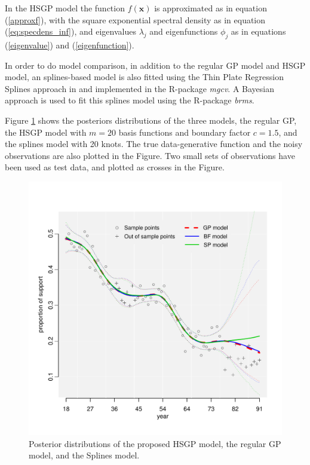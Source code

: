 \documentclass[]{interact}
\theoremstyle{plain}%
\theoremstyle{definition}
\theoremstyle{remark}
\begin{document}
In the HSGP model the function $f(\bm{x})$ is approximated as in equation (\ref{approxf}), with the square exponential spectral density as in equation (\ref{eq:specdens_inf}), and eigenvalues $\lambda_j$  and eigenfunctions $\phi_j$ as in equations (\ref{eigenvalue}) and (\ref{eigenfunction}). 

In order to do model comparison, in addition to the regular GP model and HSGP model, an splines-based model is also fitted using the Thin Plate Regression Splines approach in \cite{wood2003thin} and implemented in the R-package \textit{mgcv}. A Bayesian approach is used to fit this splines model using the R-package \textit{brms}.

Figure \ref{fig12_Posteriors_gaydata} shows the posteriors distributions of the three models, the regular GP, the HSGP model with $m=20$ basis functions and boundary factor $c=1.5$, and the splines model with 20 knots. The true data-generative function and the noisy observations are also plotted in the Figure. Two small sets of observations have been used as test data, and plotted as crosses in the Figure.

\begin{figure}[H]
\centering
\includegraphics[scale=0.50]{fig12_Posteriors_gaydata.pdf}
\caption{Posterior distributions of the proposed HSGP model, the regular GP model, and the Splines model.}
  \label{fig12_Posteriors_gaydata}
\end{figure}
\end{document}

